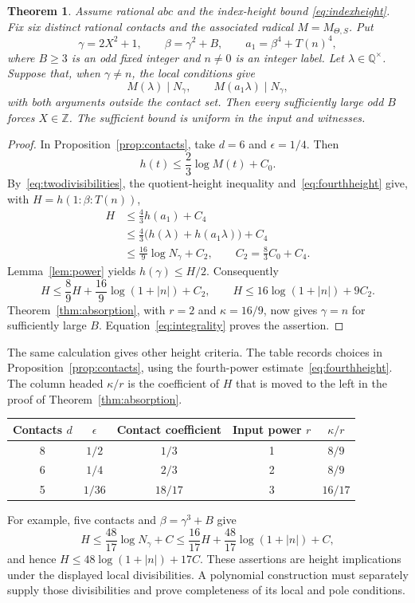 \documentclass[11pt,a4paper]{article}
\newtheorem{theorem}{Theorem}[section]
\theoremstyle{remark}\newtheorem{remark}[theorem]{Remark}
\newcommand{\Q}{\mathbb Q}\newcommand{\Z}{\mathbb Z}
\begin{document}
\begin{theorem}\label{thm:six}
Assume rational $abc$ and the index-height bound
\eqref{eq:indexheight}. Fix six distinct rational contacts and
the associated radical $M=M_{\Theta,S}$. Put
\[
 \gamma=2X^2+1,\qquad \beta=\gamma^2+B,
 \qquad a_1=\beta^4+T(n)^4,
\]
where $B\ge3$ is an odd fixed integer and $n\ne0$ is an
integer label. Let $\lambda\in\Q^\times$. Suppose that, when $\gamma\ne n$, the local
conditions give
\begin{equation}\label{eq:twodivisibilities}
             M(\lambda)\mid N_\gamma,
             \qquad M(a_1\lambda)\mid N_\gamma,
\end{equation}
with both arguments outside the contact set. Then every
sufficiently large odd $B$ forces $X\in\Z$.
The sufficient bound is uniform in the input and witnesses.
\end{theorem}
\begin{proof}
In Proposition~\ref{prop:contacts}, take $d=6$ and
$\epsilon=1/4$. Then
\[
                       h(t)\le\frac23\log M(t)+C_0.
\]
By~\eqref{eq:twodivisibilities}, the quotient-height inequality
and~\eqref{eq:fourthheight} give, with $H=h(1:\beta:T(n))$,
\[
 \begin{split}
 H&\le\frac43h(a_1)+C_4\\
  &\le\frac43\bigl(h(\lambda)+h(a_1\lambda)\bigr)+C_4\\
  &\le\frac{16}{9}\log N_\gamma+C_2,
       \qquad C_2=\frac83C_0+C_4.
 \end{split}
\]
Lemma~\ref{lem:power} yields $h(\gamma)\le H/2$. Consequently
\[
 H\le\frac89H+\frac{16}{9}\log(1+|n|)+C_2,
 \qquad H\le16\log(1+|n|)+9C_2.
\]
Theorem~\ref{thm:absorption}, with $r=2$ and $\kappa=16/9$,
now gives $\gamma=n$ for sufficiently large $B$.
Equation~\eqref{eq:integrality} proves the assertion.
\end{proof}

The same calculation gives other height criteria. The table
records choices in Proposition~\ref{prop:contacts}, using the
fourth-power estimate~\eqref{eq:fourthheight}. The column
headed $\kappa/r$ is the coefficient of $H$ that is moved to
the left in the proof of Theorem~\ref{thm:absorption}.
\begin{center}
\begin{tabular}{ccccc}
\toprule
Contacts $d$ & $\epsilon$ & Contact coefficient & Input power $r$ & $\kappa/r$\\
\midrule
8 & $1/2$ & $1/3$ & 1 & $8/9$\\
6 & $1/4$ & $2/3$ & 2 & $8/9$\\
5 & $1/36$ & $18/17$ & 3 & $16/17$\\
\bottomrule
\end{tabular}
\end{center}
For example, five contacts and $\beta=\gamma^3+B$ give
\[
 H\le\frac{48}{17}\log N_\gamma+C
       \le\frac{16}{17}H+\frac{48}{17}\log(1+|n|)+C,
\]
and hence $H\le48\log(1+|n|)+17C$.
These assertions are height implications under the displayed
local divisibilities. A polynomial construction must separately
supply those divisibilities and prove completeness of its local
and pole conditions.
\end{document}
